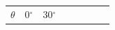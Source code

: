     
    \setlength\mytablespace{16\tabcolsep}
    \addtolength\mytablespace{9\arrayrulewidth}
    \setlength\mytablewidth{\linewidth}
        
    
    \setlength\mytableroom{\mytablewidth}
    \addtolength\mytableroom{-\mytablespace}
    
    \setlength\myfixedwidth{0pt}
    \setlength\mystarwidth{\mytableroom}
        \addtolength\mystarwidth{-\myfixedwidth}
        \divide{}
        
    
            
    
        \begin{center}
      
      \label{m39414*id86399}
      
    \noindent
      \tablelasttail{}
      \begin{xtabular*}{\mytablewidth}[t]{|p{10\mystarwidth}|p{10\mystarwidth}|p{10\mystarwidth}|p{10\mystarwidth}|p{10\mystarwidth}|p{10\mystarwidth}|p{10\mystarwidth}|p{10\mystarwidth}|}\hline
    
    
        
                  \begin{math}\theta \end{math}
                 &
    
    
        0\begin{math}{}^{\circ }\end{math} &
    
    
        30\begin{math}{}^{\circ }\end{math} &
    

\end{xtabular*}
\end{center}
